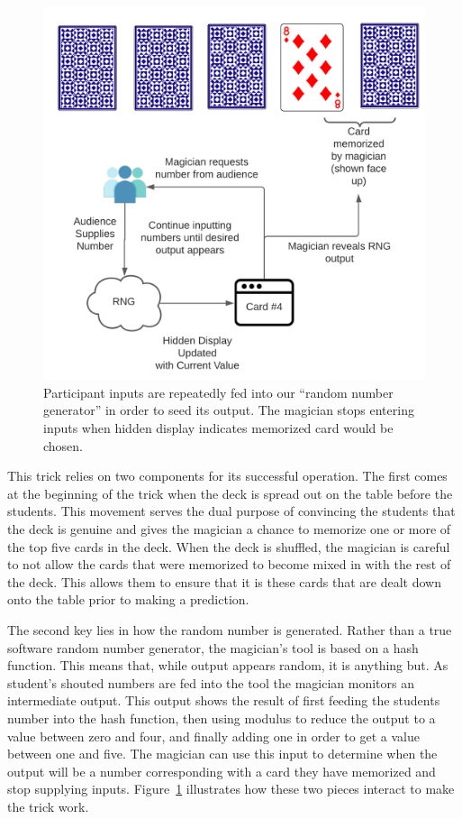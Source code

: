 \begin{figure}[H]
\centering
\includegraphics[scale=.6]{images/Trick3}
\caption{Participant inputs are repeatedly fed into our ``random number
generator'' in order to seed its output.  The magician stops entering inputs
when hidden display indicates memorized card would be chosen.}
\label{fig:trick3}
\end{figure}

This trick relies on two components for its successful operation.
The first comes at the beginning of the trick when the deck is spread out on the
table before the students.  This movement serves the dual purpose of convincing
the students that the deck is genuine and gives the magician a chance to
memorize one or more of the top five cards in the deck.  When the deck is
shuffled, the magician is careful to not allow the cards that were memorized to
become mixed in with the rest of the deck.  This allows them to ensure that it
is these cards that are dealt down onto the table prior to making a prediction.


The second key lies in how the random number is generated.
Rather than
a true software random number generator, the magician's tool is based on a hash
function.  This means that, while output appears random, it is anything but.
As student's shouted numbers are fed into the tool the magician monitors an
intermediate output.
This output shows the result of first feeding the students number
into the hash function, then using modulus to reduce the output to a value
between zero and four, and finally adding one in order to get a value between
one and five.
The magician can use this input to determine when the output will be a number
corresponding with a card they have memorized and stop supplying inputs.
Figure~\ref{fig:trick3} illustrates how these two pieces interact to make
the trick work.


